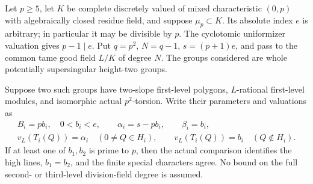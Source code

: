 Let \(p\ge5\), let \(K\) be complete discretely valued of mixed
characteristic \((0,p)\) with algebraically closed residue field,
and suppose \(\mu_p\subset K\). Its absolute index \(e\) is
arbitrary; in particular it may be divisible by \(p\).
The cyclotomic uniformizer valuation gives \(p-1\mid e\).
Put \(q=p^2\), \(N=q-1\), \(s=(p+1)e\), and pass to
the common tame good field \(L/K\) of degree \(N\).
The groups considered are whole potentially supersingular
height-two groups.

\begin{proposition}
\label{prop:B-RD84-tame}
Suppose two such groups have two-slope first-level polygons,
\(L\)-rational first-level modules, and isomorphic actual
\(p^2\)-torsion. Write their parameters and valuations as
\[
 \begin{gathered}
 B_i=pb_i,\quad0<b_i<e,\qquad
 \alpha_i=s-pb_i,\qquad\beta_i=b_i,\\
 v_L(T_i(Q))=\alpha_i\quad(0\ne Q\in H_i),\qquad
 v_L(T_i(Q))=b_i\quad(Q\notin H_i).
 \end{gathered}                                      \tag{B-RD84.1}
\]
If at least one of \(b_1,b_2\) is prime to \(p\), then
the actual comparison identifies the high lines,
\(b_1=b_2\), and the finite special characters agree.
No bound on the full second- or third-level division-field
degree is assumed.
\end{proposition}
